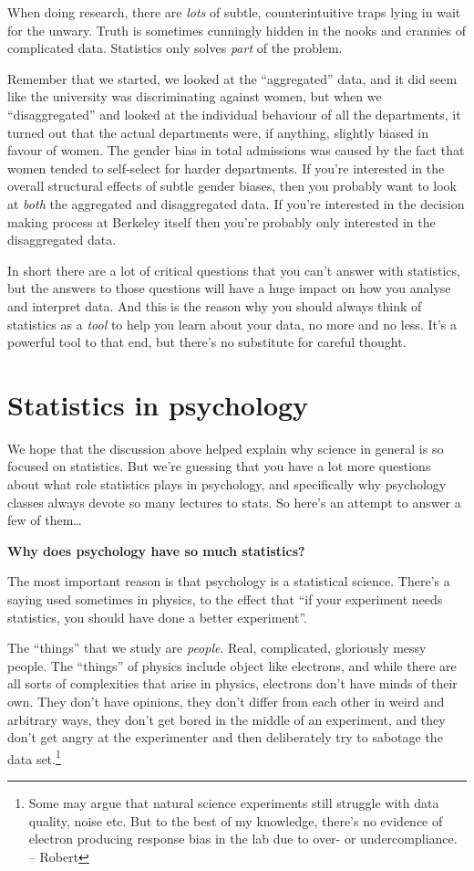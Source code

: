 \documentclass[
  11pt,
]{book}
\theoremstyle{indenteddefinition}
\theoremstyle{indenteddefinition}
\theoremstyle{definition}
\theoremstyle{definition}
\theoremstyle{remark}
\begin{document}
When doing research, there are \emph{lots} of subtle, counterintuitive traps lying in wait for the unwary. Truth is sometimes cunningly hidden in the nooks and crannies of complicated data. Statistics only solves \emph{part} of the problem.

Remember that we started, we looked at the ``aggregated'' data, and it did seem like the university was discriminating against women, but when we ``disaggregated'' and looked at the individual behaviour of all the departments, it turned out that the actual departments were, if anything, slightly biased in favour of women. The gender bias in total admissions was caused by the fact that women tended to self-select for harder departments. If you're interested in the overall structural effects of subtle gender biases, then you probably want to look at \emph{both} the aggregated and disaggregated data. If you're interested in the decision making process at Berkeley itself then you're probably only interested in the disaggregated data.

In short there are a lot of critical questions that you can't answer with statistics, but the answers to those questions will have a huge impact on how you analyse and interpret data. And this is the reason why you should always think of statistics as a \emph{tool} to help you learn about your data, no more and no less. It's a powerful tool to that end, but there's no substitute for careful thought.

\hypertarget{statistics-in-psychology}{%
\section{Statistics in psychology}\label{statistics-in-psychology}}

We hope that the discussion above helped explain why science in general is so focused on statistics. But we're guessing that you have a lot more questions about what role statistics plays in psychology, and specifically why psychology classes always devote so many lectures to stats. So here's an attempt to answer a few of them\ldots{}

\textbf{Why does psychology have so much statistics?}

The most important reason is that psychology is a statistical science. There's a saying used sometimes in physics, to the effect that ``if your experiment needs statistics, you should have done a better experiment''.

The ``things'' that we study are \emph{people}. Real, complicated, gloriously messy people. The ``things'' of physics include object like electrons, and while there are all sorts of complexities that arise in physics, electrons don't have minds of their own. They don't have opinions, they don't differ from each other in weird and arbitrary ways, they don't get bored in the middle of an experiment, and they don't get angry at the experimenter and then deliberately try to sabotage the data set.\footnote{Some may argue that natural science experiments still struggle with data quality, noise etc. But to the best of my knowledge, there's no evidence of electron producing response bias in the lab due to over- or undercompliance. -- Robert}
\end{document}
